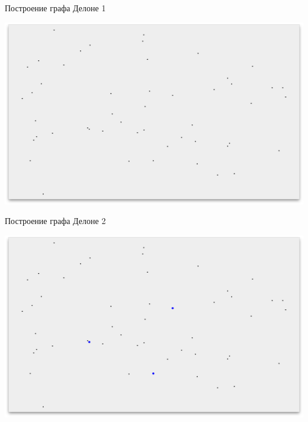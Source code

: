 \documentclass[14pt, fleqn, xcolor={dvipsnames, table}]{beamer}
\begin{document}
        \begin{frame}{Построение графа Делоне 1}
            \begin{center}
                \includegraphics[scale=0.295]{1.png}
            \end{center}             
        \end{frame}
        
        \begin{frame}{Построение графа Делоне 2}
            \begin{center}
                \includegraphics[scale=0.295]{2.png}
            \end{center}              
        \end{frame}
       
\end{document}
